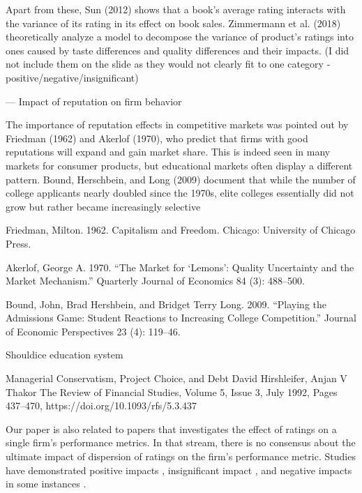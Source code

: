 \documentclass[msom,blindrev]{informs3}
\begin{document}
Apart from these, Sun (2012) shows that a book’s average rating interacts with the variance of its rating in its effect on book sales. Zimmermann et al. (2018) theoretically analyze a model to decompose the variance of product’s ratings into ones caused by taste differences and quality differences and their impacts. (I did not include them on the slide as they would not clearly fit to one category - positive/negative/insignificant)



---
Impact of reputation on firm behavior 


The importance of reputation effects in competitive markets was pointed out by
Friedman (1962) and Akerlof (1970), who predict that firms with good reputations
will expand and gain market share. This is indeed seen in many markets for consumer
products, but educational markets often display a different pattern. Bound,
Herschbein, and Long (2009) document that while the number of college applicants
nearly doubled since the 1970s, elite colleges essentially did not grow but rather
became increasingly selective


Friedman, Milton. 1962. Capitalism and Freedom. Chicago: University of Chicago Press. 

Akerlof, George A. 1970. “The Market for ‘Lemons’: Quality Uncertainty and the Market Mechanism.”
Quarterly Journal of Economics 84 (3): 488–500.

Bound, John, Brad Hershbein, and Bridget Terry Long. 2009. “Playing the Admissions Game: Student
Reactions to Increasing College Competition.” Journal of Economic Perspectives 23 (4): 119–46. 

Shouldice education system 

Managerial Conservatism, Project Choice, and Debt
David Hirshleifer,  Anjan V Thakor
The Review of Financial Studies, Volume 5, Issue 3, July 1992, Pages 437–470, https://doi.org/10.1093/rfs/5.3.437






Our paper is also related to papers that investigates the effect of ratings on a single firm's performance metrics. In that stream, there is no consensus about the ultimate impact of dispersion of ratings on the firm's performance metric. Studies have demonstrated positive impacts \citep{chintagunta2010effects,chevalier2006effect,dellarocas2007exploring}, insignificant impact \citep{duan2008online}, and negative impacts in some instances \citep{wang2015user}.
\end{document}
